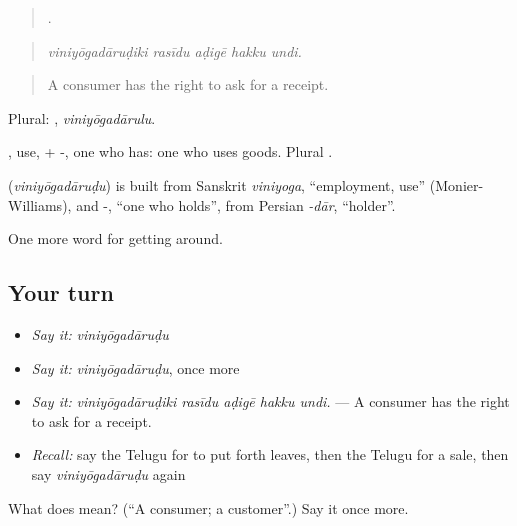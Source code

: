 \begin{quote}
    .
\end{quote}

\begin{quote}
\emph{viniyōgadāruḍiki rasīdu aḍigē hakku undi.}
\end{quote}

\begin{quote}
A consumer has the right to ask for a receipt.
\end{quote}

Plural: , \emph{viniyōgadārulu}.

, use, + -, one who has: one who uses goods. Plural .

\begin{cousinweb}
\textbf{} (\emph{viniyōgadāruḍu}) is built from Sanskrit \emph{viniyoga}, \textquotedblleft{}employment, use\textquotedblright{} (Monier-Williams), and -, \textquotedblleft{}one who holds\textquotedblright{}, from Persian \emph{-dār}, \textquotedblleft{}holder\textquotedblright{}.
\end{cousinweb}

\begin{grammarlens}[title={What you've built}]
One more word for getting around.
\end{grammarlens}

\subsection*{Your turn}
\begin{itemize}
\raggedright
  \item \emph{Say it:} \emph{viniyōgadāruḍu}
  \item \emph{Say it:} \emph{viniyōgadāruḍu}, once more
  \item \emph{Say it:} \emph{viniyōgadāruḍiki rasīdu aḍigē hakku undi.} — A consumer has the right to ask for a receipt.
  \item \emph{Recall:} say the Telugu for to put forth leaves, then the Telugu for a sale, then say \emph{viniyōgadāruḍu} again
\end{itemize}

\begin{tcolorbox}[breakable,colback=teal!4,colframe=teal!35!black,title={Before you move on}]
What does  mean? (\textquotedblleft{}A consumer; a customer\textquotedblright{}.) Say it once more.
\end{tcolorbox}
